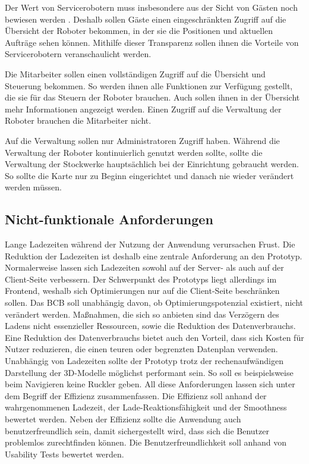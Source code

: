 Der Wert von Servicerobotern muss insbesondere aus der Sicht von Gästen noch bewiesen werden \cite[S.~429]{Paluch2020}. Deshalb sollen Gäste einen eingeschränkten Zugriff auf die Übersicht der Roboter bekommen, in der sie die Positionen und aktuellen Aufträge sehen können. Mithilfe dieser Transparenz sollen ihnen die Vorteile von Servicerobotern veranschaulicht werden.

Die Mitarbeiter sollen einen vollständigen Zugriff auf die Übersicht und Steuerung bekommen. So werden ihnen alle Funktionen zur Verfügung gestellt, die sie für das Steuern der Roboter brauchen. Auch sollen ihnen in der Übersicht mehr Informationen angezeigt werden. Einen Zugriff auf die Verwaltung der Roboter brauchen die Mitarbeiter nicht.

Auf die Verwaltung sollen nur Administratoren Zugriff haben. Während die Verwaltung der Roboter kontinuierlich genutzt werden sollte, sollte die Verwaltung der Stockwerke hauptsächlich bei der Einrichtung gebraucht werden. So sollte die Karte nur zu Beginn eingerichtet und danach nie wieder verändert werden müssen.

\subsection{Nicht-funktionale Anforderungen}
Lange Ladezeiten während der Nutzung der Anwendung verursachen Frust. Die Reduktion der Ladezeiten ist deshalb eine zentrale Anforderung an den Prototyp. Normalerweise lassen sich Ladezeiten sowohl auf der Server- als auch auf der Client-Seite verbessern. Der Schwerpunkt des Prototyps liegt allerdings im Frontend, weshalb sich Optimierungen nur auf die Client-Seite beschränken sollen. Das \ac{BCB} soll unabhängig davon, ob Optimierungspotenzial existiert, nicht verändert werden. Maßnahmen, die sich so anbieten sind das Verzögern des Ladens nicht essenzieller Ressourcen, sowie die Reduktion des Datenverbrauchs. Eine Reduktion des Datenverbrauchs bietet auch den Vorteil, dass sich Kosten für Nutzer reduzieren, die einen teuren oder begrenzten Datenplan verwenden. Unabhängig von Ladezeiten sollte der Prototyp trotz der rechenaufwändigen Darstellung der 3D-Modelle möglichst performant sein. So soll es beispielsweise beim Navigieren keine Ruckler geben. All diese Anforderungen lassen sich unter dem Begriff der Effizienz zusammenfassen. Die Effizienz soll anhand der wahrgenommenen Ladezeit, der Lade-Reaktionsfähigkeit und der Smoothness bewertet werden. Neben der Effizienz sollte die Anwendung auch benutzerfreundlich sein, damit sichergestellt wird, dass sich die Benutzer problemlos zurechtfinden können. Die Benutzerfreundlichkeit soll anhand von Usability Tests bewertet werden.
